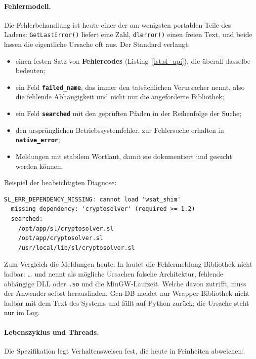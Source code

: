 \paragraph{Fehlermodell.}
\label{sec:sl_fehler}
Die Fehlerbehandlung ist heute einer der am wenigsten portablen Teile des Ladens: \texttt{GetLastError()} liefert eine Zahl, \texttt{dlerror()} einen freien Text, und beide lassen die eigentliche Ursache oft aus. Der Standard verlangt:

\begin{itemize}
	\item einen festen Satz von \textbf{Fehlercodes} (Listing~\ref{lst:sl_api}), die überall dasselbe bedeuten;
	\item ein Feld \textbf{\texttt{failed\_name}}, das immer den tatsächlichen Verursacher nennt, also die fehlende Abhängigkeit und nicht nur die angeforderte Bibliothek;
	\item ein Feld \textbf{\texttt{searched}} mit den geprüften Pfaden in der Reihenfolge der Suche;
	\item den ursprünglichen Betriebssystemfehler, zur Fehlersuche erhalten in \textbf{\texttt{native\_error}};
	\item Meldungen mit stabilem Wortlaut, damit sie dokumentiert und gesucht werden können.
\end{itemize}

Beispiel der beabsichtigten Diagnose:

\begin{lstlisting}[caption={Beabsichtigte Diagnose bei einer fehlenden Abhaengigkeit}]
SL_ERR_DEPENDENCY_MISSING: cannot load 'wsat_shim'
  missing dependency: 'cryptosolver' (required >= 1.2)
  searched:
    /opt/app/sl/cryptosolver.sl
    /opt/app/cryptosolver.sl
    /usr/local/lib/sl/cryptosolver.sl
\end{lstlisting}

Zum Vergleich die Meldungen heute: In  lautet die Fehlermeldung \glqq Bibliothek nicht ladbar: \ldots\grqq{} und nennt als mögliche Ursachen falsche Architektur, fehlende abhängige DLL oder \texttt{.so} und die MinGW-Laufzeit. Welche davon zutrifft, muss der Anwender selbst herausfinden. Gen-DB meldet nur \glqq Wrapper-Bibliothek nicht ladbar\grqq{} mit dem Text des Systems und fällt auf Python zurück; die Ursache steht nur im Log.

\paragraph{Lebenszyklus und Threads.} Die Spezifikation legt Verhaltensweisen fest, die heute in Feinheiten abweichen:

